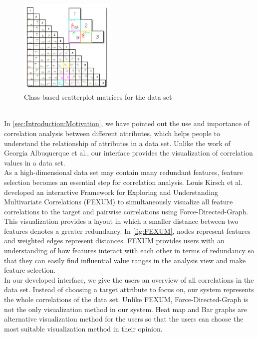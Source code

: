 \begin{figure}[h]
	\centering
	\includegraphics[width=0.4\textwidth]{pictures/C-SPLOM}
	\caption{Class-based scatterplot matrices\cite{Matrics} for the data set}
	\label{fig:C-SPLOM}
\end{figure}
\\In \autoref{sec:Introduction:Motivation}, we have pointed out the use and importance of correlation analysis between different attributes, which helps people to understand the relationship of attributes in a data set. Unlike the work of Georgia Albuquerque et al.\cite{Matrics}, our interface provides the visualization of correlation values in a data set.\\
As a high-dimensional data set may contain many redundant features, feature selection becomes an essential step for correlation analysis. Louis Kirsch et al. developed an interactive Framework for Exploring and Understanding Multivariate Correlations (FEXUM)\cite{FEXUM} to simultaneously visualize all feature correlations to the target and pairwise correlations using Force-Directed-Graph. This visualization provides a layout in which a smaller distance between two features denotes a greater redundancy. In \autoref{fig:FEXUM}, nodes represent features and weighted edges represent distances. FEXUM provides users with an understanding of how features interact with each other in terms of redundancy so that they can easily find influential value ranges in the analysis view and make feature selection.\\
In our developed interface, we give the users an overview of all correlations in the data set. Instead of choosing a target attribute to focus on, our system represents the whole correlations of the data set. Unlike FEXUM\cite{FEXUM}, Force-Directed-Graph is not the only visualization method in our system. Heat map and Bar graphs are alternative visualization method for the users so that the users can choose the most suitable visualization method in their opinion.\\
